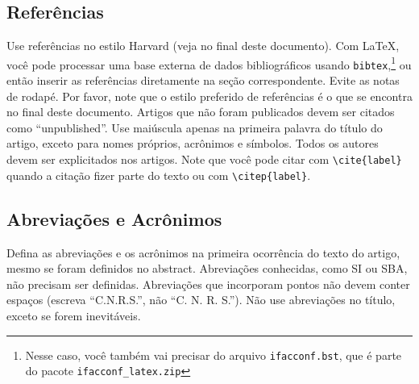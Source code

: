 \documentclass[a4paper]{ifacconf}
\begin{document}
\subsection{Referências}

Use referências no estilo Harvard (veja no final deste documento). Com
\LaTeX, você pode processar uma base externa de dados bibliográficos 
usando \texttt{bibtex},\footnote{Nesse caso, você também vai precisar do arquivo \texttt{ifacconf.bst}, que é parte do pacote \texttt{ifacconf\_latex.zip}} ou então inserir
as referências diretamente na seção correspondente. Evite as notas de rodapé.
Por favor, note que o estilo preferido de referências é o que se encontra no
final deste documento. Artigos que não foram publicados devem ser citados 
como ``unpublished''. Use maiúscula apenas na primeira palavra do título
do artigo, exceto para nomes próprios, acrônimos e símbolos. Todos os autores
devem ser explicitados nos artigos. Note que você pode citar com \texttt{\textbackslash cite\{label\}} quando a citação fizer parte do texto ou com \texttt{\textbackslash citep\{label\}}.


\subsection{Abreviações e Acrônimos}

Defina as abreviações e os acrônimos na primeira ocorrência do texto do artigo, 
mesmo se foram definidos no abstract. Abreviações conhecidas, como SI ou SBA, não
precisam ser definidas. Abreviações que incorporam pontos não devem conter espaços
(escreva ``C.N.R.S.'', não ``C. N. R. S.''). Não use abreviações no título, exceto
se forem inevitáveis. 
\end{document}
